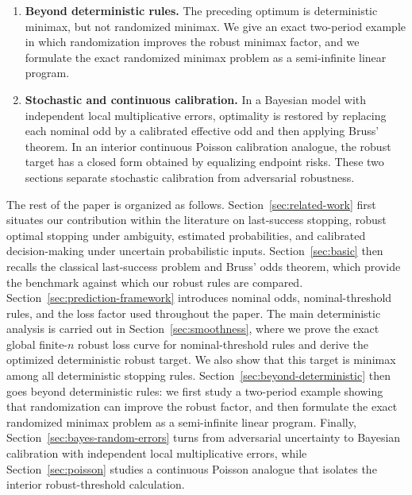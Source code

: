 \documentclass[11pt,a4paper]{article}
\begin{document}
\begin{enumerate}[label=(\arabic*)]
  We further show that this is the best possible deterministic guarantee:
  no deterministic stopping rule, even one that uses the full observed history,
  can have worst-case loss factor strictly smaller than \(\Lambda_n(\rho)\).

\item \textbf{Beyond deterministic rules.}
  The preceding optimum is deterministic minimax, but not randomized minimax.  We
  give an exact two-period example in which randomization improves the robust
  minimax factor, and we formulate the exact randomized minimax problem as a
  semi-infinite linear program.

\item \textbf{Stochastic and continuous calibration.}
  In a Bayesian model with independent local multiplicative errors, optimality
  is restored by replacing each nominal odd by a calibrated effective odd and
  then applying Bruss' theorem.  In an interior continuous Poisson calibration
  analogue, the robust target has a closed form obtained by equalizing endpoint
  risks.  These two sections separate stochastic calibration from adversarial
  robustness.
\end{enumerate}

The rest of the paper is organized as follows.
Section~\ref{sec:related-work} first situates our contribution within the
literature on last-success stopping, robust optimal stopping under ambiguity,
estimated probabilities, and calibrated decision-making under uncertain
probabilistic inputs.
Section~\ref{sec:basic} then recalls the classical last-success problem and
Bruss' odds theorem, which provide the benchmark against which our
robust rules are compared.
Section~\ref{sec:prediction-framework} introduces nominal odds, nominal-threshold
rules, and the loss factor used throughout the paper.
The main deterministic analysis is carried out in
Section~\ref{sec:smoothness}, where we prove the exact global finite-\(n\)
robust loss curve for nominal-threshold rules and derive the optimized
deterministic robust target.  We also show that this target is minimax among all
deterministic stopping rules.
Section~\ref{sec:beyond-deterministic} then goes beyond deterministic
rules: we first study a two-period example showing that randomization can
improve the robust factor, and then formulate the exact randomized minimax
problem as a semi-infinite linear program.
Finally, Section~\ref{sec:bayes-random-errors} turns from adversarial
uncertainty to Bayesian calibration with independent local multiplicative
errors, while
Section~\ref{sec:poisson} studies a continuous Poisson analogue that isolates
the interior robust-threshold calculation.
\end{document}

